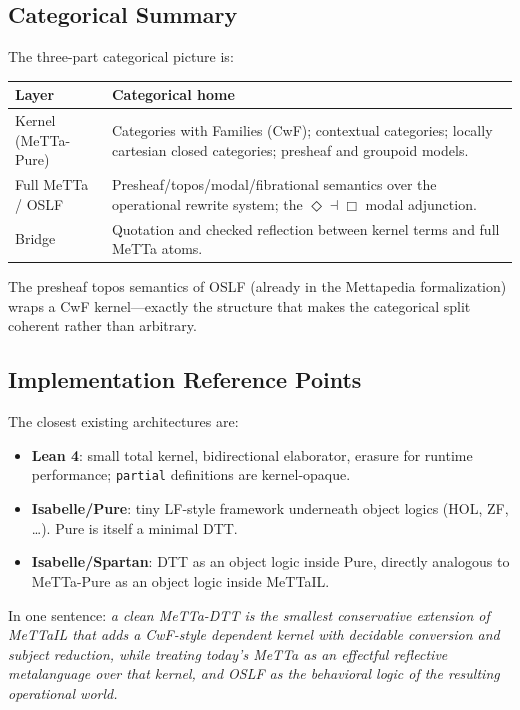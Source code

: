 \documentclass[11pt]{article}
\newcommand{\code}[1]{\texttt{#1}}
\begin{document}
\subsection{Categorical Summary}

The three-part categorical picture is:

\begin{center}
\begin{tabular}{lp{8cm}}
\toprule
Layer & Categorical home \\
\midrule
Kernel (MeTTa-Pure) &
  Categories with Families (CwF); contextual categories;
  locally cartesian closed categories; presheaf and groupoid models. \\[4pt]
Full MeTTa / OSLF &
  Presheaf/topos/modal/fibrational semantics over the operational rewrite
  system; the $\Diamond \dashv \Box$ modal adjunction. \\[4pt]
Bridge &
  Quotation and checked reflection between kernel terms and full MeTTa atoms. \\
\bottomrule
\end{tabular}
\end{center}

The presheaf topos semantics of OSLF (already in the Mettapedia formalization)
wraps a CwF kernel---exactly the structure that makes the categorical split
coherent rather than arbitrary.

\subsection{Implementation Reference Points}

The closest existing architectures are:
\begin{itemize}
  \item \textbf{Lean 4}: small total kernel, bidirectional elaborator, erasure
        for runtime performance; \code{partial} definitions are kernel-opaque.
  \item \textbf{Isabelle/Pure}: tiny LF-style framework underneath object
        logics (HOL, ZF, \ldots). Pure is itself a minimal DTT.
  \item \textbf{Isabelle/Spartan}: DTT as an object logic inside Pure,
        directly analogous to MeTTa-Pure as an object logic inside MeTTaIL.
\end{itemize}

In one sentence: \emph{a clean MeTTa-DTT is the smallest conservative
extension of MeTTaIL that adds a CwF-style dependent kernel with decidable
conversion and subject reduction, while treating today's MeTTa as an effectful
reflective metalanguage over that kernel, and OSLF as the behavioral logic of
the resulting operational world.}
\end{document}
